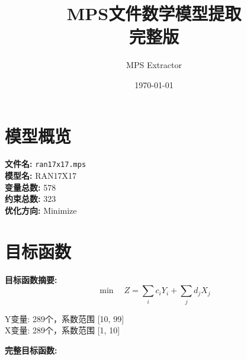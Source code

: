 \documentclass[a4paper,10pt]{article}
\title{MPS文件数学模型提取\\{\large 完整版}}
\author{MPS Extractor}
\date{\today}
\begin{document}
\maketitle
\tableofcontents
\newpage

\section{模型概览}

\textbf{文件名:} \texttt{ran17x17.mps} \\
\textbf{模型名:} RAN17X17 \\
\textbf{变量总数:} 578 \\
\textbf{约束总数:} 323 \\
\textbf{优化方向:} Minimize \\

\section{目标函数}

\textbf{目标函数摘要:}
\begin{equation}
\min \quad Z = \sum_{i} c_i Y_i + \sum_{j} d_j X_j
\end{equation}

Y变量: 289个，系数范围 [10, 99] \\
X变量: 289个，系数范围 [1, 10]

\textbf{完整目标函数:}
\end{document}
